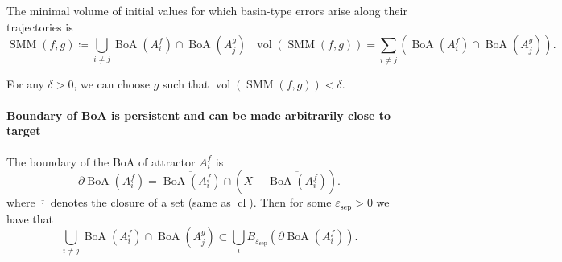 \documentclass{article}
\newcommand{\cl}{\operatorname{cl}}
\newcommand{\vol}{\operatorname{vol}}
\newcommand{\boa}{\operatorname{BoA}}
\newcounter{ct}
\begin{document}
The minimal volume of initial values for which basin-type errors arise along their trajectories is 
\begin{equation}
\operatorname{SMM}(f,g) \coloneqq \bigcup_{i \neq j}\boa(A_i^f)\cap\boa(A_j^g) \ \ \  \vol \left(\operatorname{SMM}(f,g)\right) =  \sum_{i \neq j} \left(\boa(A_i^f)\cap\boa(A_j^g)\right).
\end{equation}


\begin{proposition}\label{prop:min_sep_bound}
For any $\delta>0$, we can choose $g$ such that $ \vol \left(\operatorname{SMM}(f,g)\right) <\delta$.
\end{proposition}


\paragraph{Boundary of BoA is persistent and can be made arbitrarily close to target}%
The boundary of the BoA of attractor $A_i^f$ is %
\[\partial\boa(A_i^f) = \overline{\boa(A_i^f)} \cap (X - \overline{\boa(A_i^f)}).\]
where \(\overline{\cdot}\) denotes the closure of a set (same as \(\cl\)). %
Then for some  $\varepsilon_{\operatorname{sep}}>0$ we have that 
\begin{equation}\label{eq:separatrixoverlap}
\bigcup_{i\neq j} \boa(A_i^f)\cap\boa(A_j^g) \subset \bigcup_i B_{\varepsilon_{\operatorname{sep}}}(\partial\boa(A_i^f)). 
\end{equation}

\end{document}
